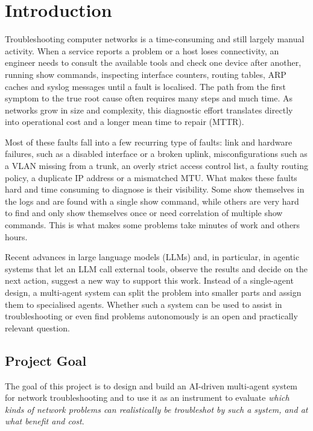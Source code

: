 \section{Introduction}
\label{sec:introduction}

Troubleshooting computer networks is a time-consuming and still largely manual
activity. When a service reports a problem or a host loses connectivity, an
engineer needs to consult the available tools and check one device after another, running
show commands, inspecting interface counters, routing tables, ARP caches
and syslog messages until a fault is localised. The path from the first symptom to the true root cause
often requires many steps and much time. As networks
grow in size and complexity, this diagnostic effort translates directly into
operational cost and a longer mean time to repair (MTTR).

Most of these faults fall into a few recurring type of faults: link and hardware failures, such as a disabled
interface or a broken uplink, misconfigurations such as a VLAN missing
from a trunk, an overly strict access control list, a faulty routing policy, a
duplicate IP address or a mismatched MTU. What makes these faults hard and time consuming to
diagnose is their visibility. Some show themselves in
the logs and are found with a single show command, while others are very hard to find
and only show themselves once or need correlation of multiple show commands.
This is what makes some problems take minutes of work and others hours.

Recent advances in large language models (LLMs) and, in particular, in
agentic systems that let an LLM call external tools, observe the results
and decide on the next action, suggest a new way to support this work. Instead of
a single-agent design, a multi-agent system can split the problem
into smaller parts and assign them to specialised agents.
Whether such a system can be used to assist in troubleshooting or even find problems autonomously is an open
and practically relevant question.

\subsection{Project Goal}

The goal of this project is to design and build an AI-driven multi-agent system
for network troubleshooting and to use it as an instrument to evaluate
\emph{which kinds of network problems can realistically be troubleshot by such
a system, and at what benefit and cost}. 

